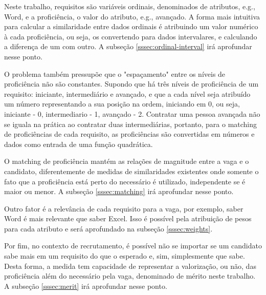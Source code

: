 \documentclass[preprint,12pt]{elsarticle}
\begin{document}
Neste trabalho, requisitos são variáveis ordinais, denominados de atributos, e.g., Word, e a proficiência, o valor do atributo, e.g., avançado. A forma mais intuitiva para calcular a similaridade entre dados ordinais é atribuindo um valor numérico à cada proficiência, ou seja, os convertendo para dados intervalares, e calculando a diferença de um com outro. A subseção \ref{sssec:ordinal-interval} irá aprofundar nesse ponto.

O problema também pressupõe que o "espaçamento" entre os níveis de proficiência não são constantes. Supondo que há três níveis de proficiência de um requisito: iniciante, intermediário e avançado, e que a cada nível seja atribuído um número representando a sua posição na ordem, iniciando em 0, ou seja, iniciante - 0, intermediario - 1, avançado - 2. Contratar uma pessoa avançada não se iguala na prática ao contratar duas intermediárias, portanto, para o matching de proficiências de cada requisito, as proficiências são convertidas em números e dados como entrada de uma função quadrática. 

O matching de proficiência mantém as relações de magnitude entre a vaga e o candidato, diferentemente de medidas de similaridades existentes onde somente o fato que a proficiência está perto do necessário é utilizado, independente se é maior ou menor. A subseção \ref{sssec:matching} irá aprofundar nesse ponto.

Outro fator é a relevância de cada requisito para a vaga, por exemplo, saber Word é mais relevante que saber Excel. Isso é possível pela atribuição de pesos para cada atributo e será aprofundado na subseção \ref{sssec:weights}.

Por fim, no contexto de recrutamento, é possível não se importar se um candidato sabe mais em um requisito do que o esperado e, sim, simplesmente que sabe. Desta forma, a medida tem capacidade de representar a valorização, ou não, das proficiência além do necessário pela vaga, denominado de mérito neste trabalho. A subseção \ref{sssec:merit} irá aprofundar nesse ponto.


\end{document}
